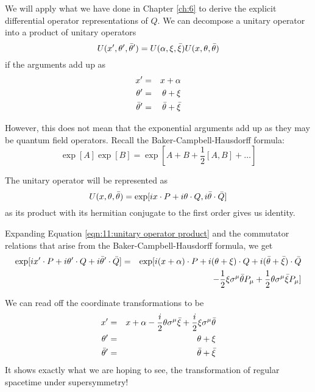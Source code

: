 We will apply what we have done in Chapter \ref{ch:6} to derive the explicit differential operator representations of $Q$. We can decompose a unitary operator into a product of unitary operators
\begin{equation}
    U(x^\prime, \theta^\prime, \Bar{\theta}^\prime) = U(\alpha, \xi, \Bar{\xi}) U(x, \theta, \Bar{\theta})
    \label{eqn:11:unitary operator product}
\end{equation}
if the arguments add up as
\begin{eqnarray*}
    x^\prime &=& x + \alpha \nonumber \\
    \theta^\prime &=& \theta + \xi \nonumber \\
    \Bar{\theta}^\prime &=& \Bar{\theta} + \Bar{\xi}
\end{eqnarray*}

However, this does not mean that the exponential arguments add up as they may be quantum field operators. Recall the Baker-Campbell-Hausdorff formula:
\begin{equation}
    \exp[A]\exp[B] = \exp[A + B + \frac{1}{2}[A,B] + \dots]
\end{equation}

The unitary operator will be represented as
\begin{equation}
    U(x, \theta, \Bar{\theta}) = \exp[i x\cdot P + i \theta\cdot Q, i \Bar{\theta}\cdot\Bar{Q}]
\end{equation}
as its product with its hermitian conjugate to the first order gives us identity.

Expanding Equation \ref{eqn:11:unitary operator product} and the commutator relations that arise from the Baker-Campbell-Hausdorff formula, we get
\begin{eqnarray}
    \exp[i x^\prime \cdot P + i \theta^\prime \cdot Q + i \Bar{\theta}^\prime \cdot \Bar{Q}] &=& \exp[i (x+\alpha)\cdot P + i(\theta+\xi)\cdot Q + i(\Bar{\theta}+\Bar{\xi})\cdot\Bar{Q} \nonext
    && - \frac{1}{2}\xi \sigma^\mu \Bar{\theta}P_\mu + \frac{1}{2} \theta\sigma^\mu\Bar{\xi}P_\mu]
    \label{eqn:11:unitary operator product expanded}
\end{eqnarray}

We can read off the coordinate transformations to be
\begin{eqnarray}
    x^\prime &=& x + \alpha - \frac{i}{2} \theta\sigma^\mu\Bar{\xi} + \frac{i}{2} \xi\sigma^\mu\Bar{\theta} \nonext
    \theta^\prime &=& \theta + \xi \nonext
    \Bar{\theta}^\prime &=& \Bar{\theta} + \Bar{\xi}
    \label{eqn:11:coordinate transformations}
\end{eqnarray}
It shows exactly what we are hoping to see, the transformation of regular spacetime under supersymmetry!

